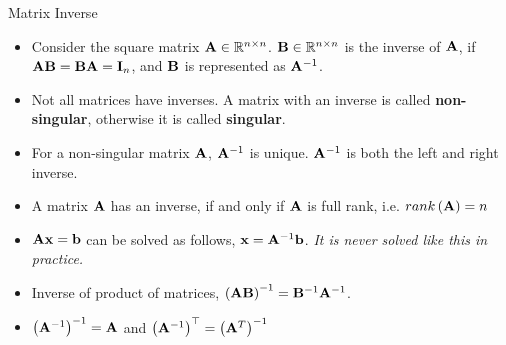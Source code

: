 \documentclass[aspectratio=169]{beamer}
\let\olditem\item
\renewcommand{\item}{\setlength{\itemsep}{\fill}\olditem}
\def\mf{\ensuremath\mathbf}
\begin{document}
\begin{frame}[t]{Matrix Inverse}
\begin{small}
\begin{itemize}
    \item Consider the square matrix $\mf{A} \in \mathbb{R}^{n \times n}$. $\mf{B} \in \mathbb{R}^{n \times n}$ is the inverse of $\mf{A}$, if $\mf{AB} = \mf{BA} = \mf{I}_n$, and $\mf{B}$ is represented as $\mf{A}^{-1}$.
    \item Not all matrices have inverses. A matrix with an inverse is called \textbf{non-singular}, otherwise it is called \textbf{singular}.
    \item For a non-singular matrix $\mf{A}$, $\mf{A}^{-1}$ is unique. $\mf{A}^{-1}$ is both the left and right inverse.
    \item A matrix $\mf{A}$ has an inverse, if and only if $\mf{A}$ is full rank, i.e. $rank\left(\mf{A}\right) = n$
    \item $\mf{Ax} = \mf{b}$ can be solved as follows, $\mf{x} = \mf{A}^{-1}\mf{b}$. \textit{It is never solved like this in practice.}
    \item Inverse of product of matrices, $\left(\mf{AB}\right)^{-1} = \mf{B}^{-1}\mf{A}^{-1}$.
    \item $\left(\mf{A}^{-1}\right)^{-1} = \mf{A}$ and $\left(\mf{A}^{-1}\right)^{\top} = \left(\mathbf{A}^{T}\right)^{-1}$
\end{itemize}
\end{small}
\end{frame}
\end{document}
